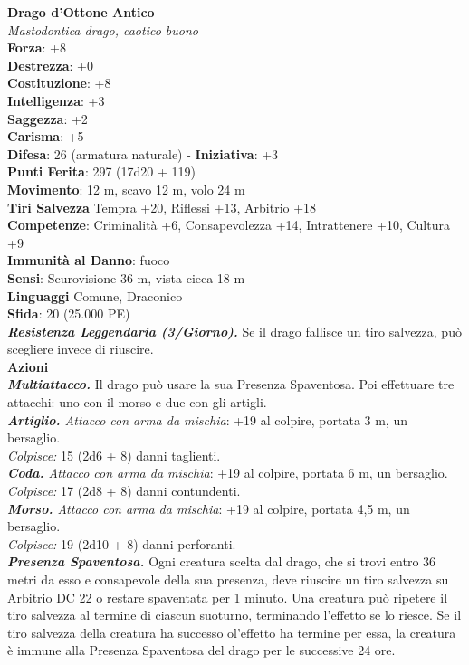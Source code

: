 \begin{multicols}{2}
\medskip\textbf{Drago d'Ottone Antico}\\
\emph{Mastodontica drago, caotico buono}\\
\textbf{Forza}: +8\\
\textbf{Destrezza}: +0\\
\textbf{Costituzione}: +8\\
\textbf{Intelligenza}: +3\\
\textbf{Saggezza}: +2\\
\textbf{Carisma}: +5\\
\textbf{Difesa}: 26 (armatura naturale) - \textbf{Iniziativa}: +3\\
\textbf{Punti Ferita}: 297 (17d20 + 119)\\
\textbf{Movimento}: 12 m, scavo 12 m, volo 24 m\\
\textbf{Tiri Salvezza} Tempra +20, Riflessi +13, Arbitrio +18\\
\textbf{Competenze}: Criminalità +6, Consapevolezza +14, Intrattenere +10, Cultura +9\\
\textbf{Immunità al Danno}: fuoco\\
\textbf{Sensi}: Scurovisione 36 m, vista cieca 18 m\\
\textbf{Linguaggi} Comune, Draconico\\
\textbf{Sfida}: 20 (25.000 PE)\smallskip\\
\emph{\textbf{Resistenza Leggendaria (3/Giorno).}} Se il drago fallisce un tiro salvezza, può scegliere invece di riuscire.\\
\smallskip\textbf{Azioni}\\
\emph{\textbf{Multiattacco.}} Il drago può usare la sua Presenza Spaventosa. Poi effettuare tre attacchi: uno con il morso e due con gli artigli.\\
\emph{\textbf{Artiglio.} Attacco con arma da mischia}: +19 al colpire, portata 3 m, un bersaglio.\\
\emph{Colpisce:} 15 (2d6 + 8) danni taglienti.\\
\emph{\textbf{Coda.} Attacco con arma da mischia}: +19 al colpire, portata 6 m, un bersaglio.\\
\emph{Colpisce:} 17 (2d8 + 8) danni contundenti.\\
\emph{\textbf{Morso.} Attacco con arma da mischia}: +19 al colpire, portata 4,5 m, un bersaglio.\\
\emph{Colpisce:} 19 (2d10 + 8) danni perforanti.\\
\emph{\textbf{Presenza Spaventosa.}} Ogni creatura scelta dal drago, che si trovi entro 36 metri da esso e consapevole della sua presenza, deve riuscire un tiro salvezza su Arbitrio DC  22 o restare spaventata per 1 minuto. Una creatura può ripetere il tiro salvezza al termine di ciascun suoturno,  terminando l'effetto se lo riesce. Se il tiro salvezza della creatura ha successo ol'effetto ha termine per essa, la creatura è  immune alla Presenza Spaventosa del drago per le successive 24 ore.\\

\end{multicols}
